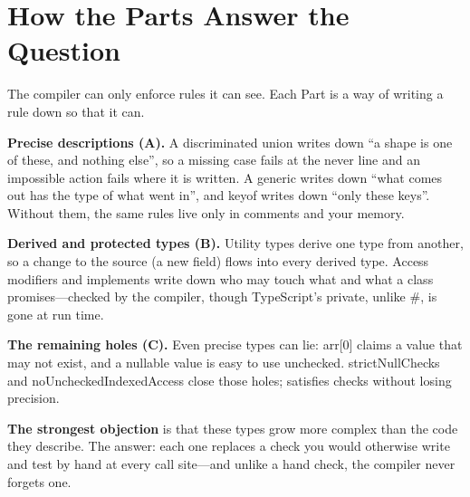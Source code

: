 \documentclass[10pt]{article}
\newcommand{\code}[1]{{\ttfamily\small #1}}
\begin{document}
\label{synthesis}
\section*{How the Parts Answer the Question}

The compiler can only enforce rules it can see. Each Part is a way of writing a rule down so that it can.

\textbf{Precise descriptions (A).} A discriminated union writes down ``a shape is one of these, and nothing else'', so a missing case fails at the \code{never} line and an impossible action fails where it is written. A generic writes down ``what comes out has the type of what went in'', and \code{keyof} writes down ``only these keys''. Without them, the same rules live only in comments and your memory.

\textbf{Derived and protected types (B).} Utility types derive one type from another, so a change to the source (a new field) flows into every derived type. Access modifiers and \code{implements} write down who may touch what and what a class promises---checked by the compiler, though TypeScript's \code{private}, unlike \code{\#}, is gone at run time.

\textbf{The remaining holes (C).} Even precise types can lie: \code{arr[0]} claims a value that may not exist, and a nullable value is easy to use unchecked. \code{strictNullChecks} and \code{noUncheckedIndexedAccess} close those holes; \code{satisfies} checks without losing precision.

\textbf{The strongest objection} is that these types grow more complex than the code they describe. The answer: each one replaces a check you would otherwise write and test by hand at every call site---and unlike a hand check, the compiler never forgets one.
\end{document}
